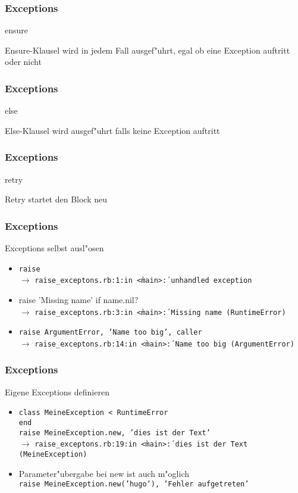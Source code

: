 \documentclass{beamer}
\begin{document}
\begin{frame}
  \frametitle{Exceptions}
  ensure
  
  Ensure-Klausel wird in jedem Fall ausgef"uhrt, egal ob eine Exception auftritt oder nicht
\end{frame}

\begin{frame}
  \frametitle{Exceptions}
  else
  
  Else-Klausel wird ausgef"uhrt falls keine Exception auftritt
\end{frame}

\begin{frame}
  \frametitle{Exceptions}
  retry
  
  Retry startet den Block neu
\end{frame}

\begin{frame}
  \frametitle{Exceptions}
  Exceptions selbst ausl"osen
  \begin{itemize}[<+->]
    \item \texttt{raise} \\
      $\longrightarrow$ \texttt{raise\_exceptons.rb:1:in \`<main>\': unhandled exception}
    \item{raise 'Missing name' if name.nil?} \\
      $\longrightarrow$ \texttt{raise\_exceptons.rb:3:in \`<main>\': Missing name (RuntimeError)}
    \item \texttt{raise ArgumentError, 'Name too big', caller} \\
          $\longrightarrow$ \texttt{raise\_exceptons.rb:14:in \`<main>\': Name too big (ArgumentError)}
  \end{itemize}
\end{frame}

\begin{frame}
  \frametitle{Exceptions}
  Eigene Exceptions definieren 
  \begin{itemize}
    \item \texttt{class MeineException < RuntimeError \\
end \\
raise MeineException.new, 'dies ist der Text'}  \\
\vspace{3ex}$\longrightarrow$ \texttt{raise\_exceptons.rb:19:in \`<main>\': dies ist der Text (MeineException)}
    \item Parameter"ubergabe bei new ist auch m"oglich\\
          \texttt{raise MeineException.new('hugo'), 'Fehler aufgetreten'}
  \end{itemize}
\end{frame}
\end{document}
